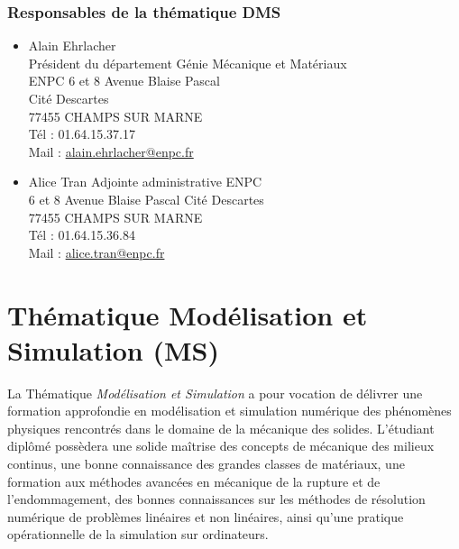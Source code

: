 \documentclass[french,11pt]{article}
\begin{document}
\subsubsection{Responsables de la thématique DMS}
\begin{itemize}
\item  
Alain Ehrlacher\\ 
Président du département Génie Mécanique et Matériaux \\ENPC 6 et 8 Avenue Blaise Pascal\\
Cité Descartes \\
77455 CHAMPS SUR MARNE \\
Tél : 01.64.15.37.17 \\
Mail : \href{mailto:alain.ehrlacher@enpc.fr}{alain.ehrlacher@enpc.fr}

\item
Alice Tran Adjointe administrative ENPC\\
6 et 8 Avenue Blaise Pascal Cité Descartes \\
77455 CHAMPS SUR MARNE \\
Tél : 01.64.15.36.84 \\
Mail : \href{mailto:alice.tran@enpc.fr}{alice.tran@enpc.fr}
\end{itemize}
\newpage


\section{Thématique Modélisation et Simulation (MS)}


La Thématique \emph{Modélisation et Simulation} a pour vocation de délivrer une formation approfondie en modélisation et simulation numérique des phénomènes physiques rencontrés dans le domaine de la mécanique des solides.
L'étudiant diplômé possèdera une solide maîtrise des concepts de mécanique des milieux continus, une bonne connaissance des grandes classes de matériaux, une formation aux méthodes avancées en mécanique de la rupture et de l'endommagement, des bonnes connaissances sur les méthodes de résolution numérique de problèmes linéaires et non linéaires, ainsi qu'une pratique opérationnelle de la simulation sur ordinateurs.
\end{document}

